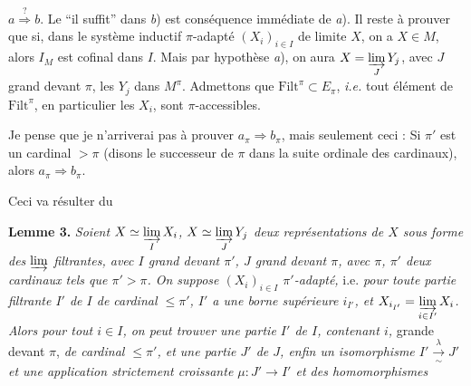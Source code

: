 $a\overset{?}{\Longrightarrow} b$. Le ``il suffit'' dans \textit{b}) est conséquence immédiate de \textit{a}). Il reste à prouver que si, dans le système inductif $\pi$-adapté $(X_i)_{i\in I}$ de limite $X$, on a $X\in M$, alors $I_M$ est cofinal dans $I$. Mais par hypothèse \textit{a}), on aura $X = \varinjlim\limits_J Y_j$, avec $J$ grand devant $\pi$, les $Y_j$ dans $M^\pi$. Admettons que $\mathrm{Filt}^\pi\subset E_\pi$, \textit{i.e.} tout élément de $\mathrm{Filt}^\pi$, en particulier les $X_i$, sont $\pi$-accessibles.

Je pense que je n'arriverai pas à prouver $a_\pi\Longrightarrow b_\pi$, mais seulement ceci : Si $\pi'$ est un cardinal $>\pi$ (disons le successeur de $\pi$ dans la suite ordinale des cardinaux), alors $a_\pi\Longrightarrow b_\pi$.

Ceci va résulter du

\textbf{Lemme 3.} \textit{Soient $X\simeq\varinjlim\limits_I X_i$, $X\simeq\varinjlim\limits_J Y_j$ deux représentations de $X$ sous forme des $\varinjlim$ filtrantes, avec $I$ grand devant $\pi'$, $J$ grand devant $\pi$, avec $\pi$, $\pi'$ deux cardinaux tels que $\pi'>\pi$. On suppose $(X_i)_{i\in I}$ $\pi'$-adapté,} i.e. \textit{pour toute partie filtrante $I'$ de $I$ de cardinal $\le\pi'$, $I'$ a une borne supérieure $i_{I'}$, et $X_{i_{I'}} = \varinjlim\limits_{i\in I'} X_i$. Alors pour tout $i\in I$, on peut trouver une partie $I'$ de $I$, contenant $i$,} grande devant $\pi$, \textit{de cardinal $\le\pi'$, et une partie $J'$ de $J$, enfin un isomorphisme $I'\xrightarrow[\sim]{\lambda}J'$ et une application strictement croissante $\mu : J'\longrightarrow I'$ et des homomorphismes}

